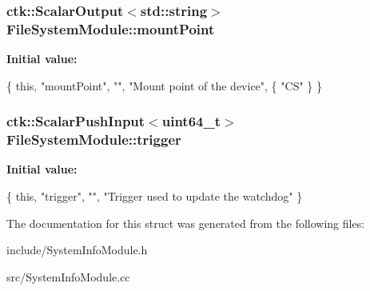 \subsubsection[{\texorpdfstring{mount\+Point}{mountPoint}}]{\setlength{\rightskip}{0pt plus 5cm}ctk\+::\+Scalar\+Output$<$std\+::string$>$ File\+System\+Module\+::mount\+Point}\hypertarget{structFileSystemModule_a545e53dc460a9bc47d589769b76c452d}{}\label{structFileSystemModule_a545e53dc460a9bc47d589769b76c452d}
{\bfseries Initial value\+:}
\begin{DoxyCode}
\{ \textcolor{keyword}{this}, \textcolor{stringliteral}{"mountPoint"}, \textcolor{stringliteral}{""}, \textcolor{stringliteral}{"Mount point of the device"},
          \{ \textcolor{stringliteral}{"CS"} \} \}
\end{DoxyCode}
\subsubsection[{\texorpdfstring{trigger}{trigger}}]{\setlength{\rightskip}{0pt plus 5cm}ctk\+::\+Scalar\+Push\+Input$<$uint64\+\_\+t$>$ File\+System\+Module\+::trigger}\hypertarget{structFileSystemModule_a9aa6745dca44753b6b41bdacfbad39b6}{}\label{structFileSystemModule_a9aa6745dca44753b6b41bdacfbad39b6}
{\bfseries Initial value\+:}
\begin{DoxyCode}
\{ \textcolor{keyword}{this}, \textcolor{stringliteral}{"trigger"}, \textcolor{stringliteral}{""},
      \textcolor{stringliteral}{"Trigger used to update the watchdog"} \}
\end{DoxyCode}


The documentation for this struct was generated from the following files\+:\begin{DoxyCompactItemize}
\item 
include/System\+Info\+Module.\+h\item 
src/System\+Info\+Module.\+cc\end{DoxyCompactItemize}
